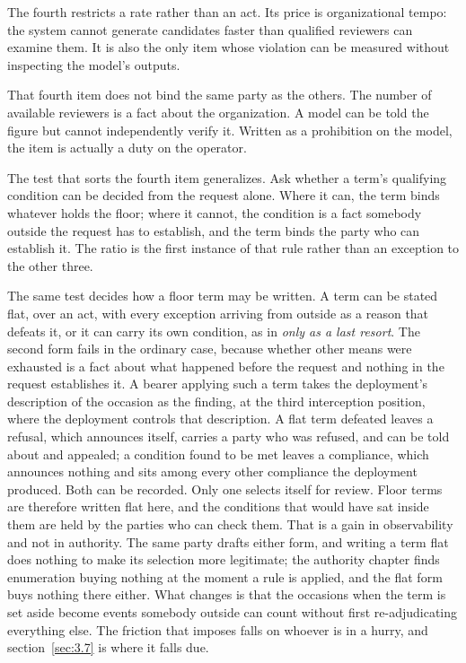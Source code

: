 The fourth restricts a rate rather than an act. Its price is organizational tempo: the system cannot generate candidates faster than qualified reviewers can examine them. It is also the only item whose violation can be measured without inspecting the model's outputs.

That fourth item does not bind the same party as the others. The number of available reviewers is a fact about the organization. A model can be told the figure but cannot independently verify it. Written as a prohibition on the model, the item is actually a duty on the operator.

The test that sorts the fourth item generalizes. Ask whether a term's qualifying condition can be decided from the request alone. Where it can, the term binds whatever holds the floor; where it cannot, the condition is a fact somebody outside the request has to establish, and the term binds the party who can establish it. The ratio is the first instance of that rule rather than an exception to the other three.

The same test decides how a floor term may be written. A term can be stated flat, over an act, with every exception arriving from outside as a reason that defeats it, or it can carry its own condition, as in \emph{only as a last resort}. The second form fails in the ordinary case, because whether other means were exhausted is a fact about what happened before the request and nothing in the request establishes it. A bearer applying such a term takes the deployment's description of the occasion as the finding, at the third interception position, where the deployment controls that description. A flat term defeated leaves a refusal, which announces itself, carries a party who was refused, and can be told about and appealed; a condition found to be met leaves a compliance, which announces nothing and sits among every other compliance the deployment produced. Both can be recorded. Only one selects itself for review. Floor terms are therefore written flat here, and the conditions that would have sat inside them are held by the parties who can check them. That is a gain in observability and not in authority. The same party drafts either form, and writing a term flat does nothing to make its selection more legitimate; the authority chapter finds enumeration buying nothing at the moment a
rule is applied, and the flat form buys nothing there either. What changes is that the occasions when the term is set aside become events somebody outside can count without first re-adjudicating everything else. The friction that imposes falls on whoever is in a hurry, and section~\ref{sec:3.7} is where it falls due.

